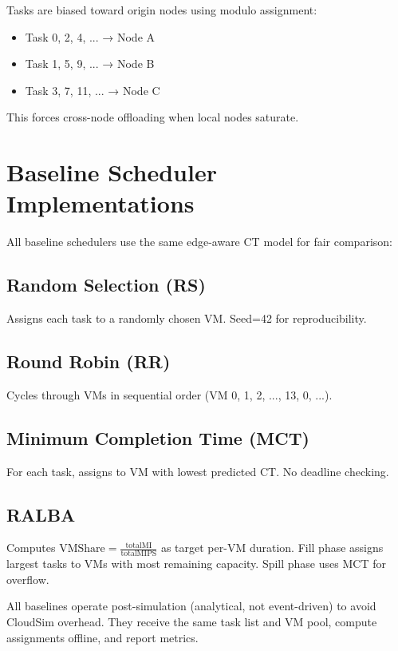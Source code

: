 \documentclass[12pt]{report}
\begin{document}
Tasks are biased toward origin nodes using modulo assignment:
\begin{itemize}
    \item Task 0, 2, 4, ... → Node A
    \item Task 1, 5, 9, ... → Node B
    \item Task 3, 7, 11, ... → Node C
\end{itemize}

This forces cross-node offloading when local nodes saturate.

\section{Baseline Scheduler Implementations}

All baseline schedulers use the same edge-aware CT model for fair comparison:

\subsection{Random Selection (RS)}

Assigns each task to a randomly chosen VM. Seed=42 for reproducibility.

\subsection{Round Robin (RR)}

Cycles through VMs in sequential order (VM 0, 1, 2, ..., 13, 0, ...).

\subsection{Minimum Completion Time (MCT)}

For each task, assigns to VM with lowest predicted CT. No deadline checking.

\subsection{RALBA}

Computes $\text{VMShare} = \frac{\text{totalMI}}{\text{totalMIPS}}$ as target per-VM duration. Fill phase assigns largest tasks to VMs with most remaining capacity. Spill phase uses MCT for overflow.

All baselines operate post-simulation (analytical, not event-driven) to avoid CloudSim overhead. They receive the same task list and VM pool, compute assignments offline, and report metrics.
\end{document}
